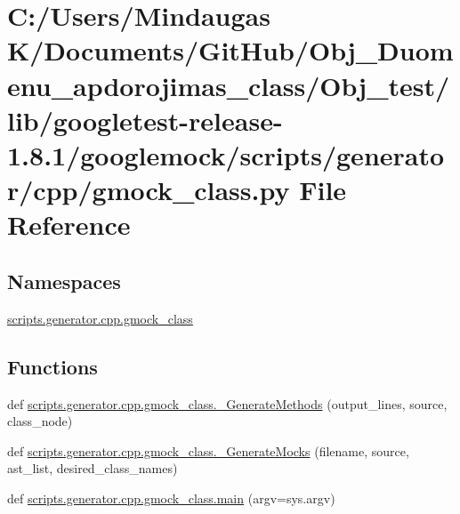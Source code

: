\hypertarget{_obj__test_2lib_2googletest-release-1_88_81_2googlemock_2scripts_2generator_2cpp_2gmock__class_8py}{}\section{C\+:/\+Users/\+Mindaugas K/\+Documents/\+Git\+Hub/\+Obj\+\_\+\+Duomenu\+\_\+apdorojimas\+\_\+class/\+Obj\+\_\+test/lib/googletest-\/release-\/1.8.1/googlemock/scripts/generator/cpp/gmock\+\_\+class.py File Reference}
\label{_obj__test_2lib_2googletest-release-1_88_81_2googlemock_2scripts_2generator_2cpp_2gmock__class_8py}
\subsection*{Namespaces}
\begin{DoxyCompactItemize}
\item 
 \mbox{\hyperlink{namespacescripts_1_1generator_1_1cpp_1_1gmock__class}{scripts.\+generator.\+cpp.\+gmock\+\_\+class}}
\end{DoxyCompactItemize}
\subsection*{Functions}
\begin{DoxyCompactItemize}
\item 
def \mbox{\hyperlink{namespacescripts_1_1generator_1_1cpp_1_1gmock__class_a340e0ffbe8b474084a4f663beda502c7}{scripts.\+generator.\+cpp.\+gmock\+\_\+class.\+\_\+\+Generate\+Methods}} (output\+\_\+lines, source, class\+\_\+node)
\item 
def \mbox{\hyperlink{namespacescripts_1_1generator_1_1cpp_1_1gmock__class_a7d22be543c8d00fa9447423613f5051a}{scripts.\+generator.\+cpp.\+gmock\+\_\+class.\+\_\+\+Generate\+Mocks}} (filename, source, ast\+\_\+list, desired\+\_\+class\+\_\+names)
\item 
def \mbox{\hyperlink{namespacescripts_1_1generator_1_1cpp_1_1gmock__class_a402035a2654a8c5df5cfc472fab3387a}{scripts.\+generator.\+cpp.\+gmock\+\_\+class.\+main}} (argv=sys.\+argv)
\end{DoxyCompactItemize}
